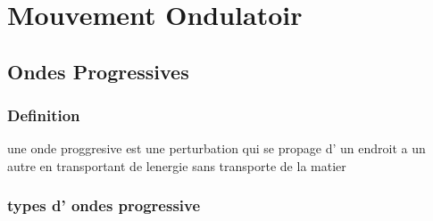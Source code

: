 \documentclass[12pt]{book}
\begin{document}
    \chapter{Mouvement Ondulatoir}
        \section{Ondes Progressives}
            \subsection*{Definition}
                une onde proggresive est une perturbation qui se propage d' un endroit a un autre en transportant de lenergie sans transporte de la matier
            \subsection*{types d' ondes progressive}
\end{document}
